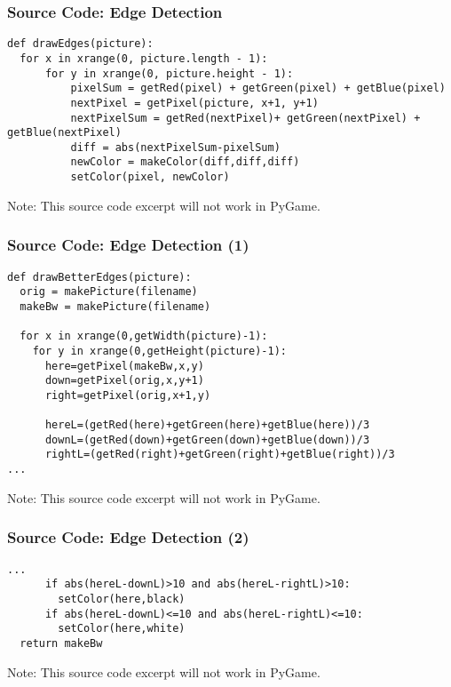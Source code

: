 \begin{frame}[fragile]
	\frametitle{Source Code: Edge Detection}
	
\begin{lstlisting}
def drawEdges(picture):
  for x in xrange(0, picture.length - 1):
      for y in xrange(0, picture.height - 1):
          pixelSum = getRed(pixel) + getGreen(pixel) + getBlue(pixel)
          nextPixel = getPixel(picture, x+1, y+1)
          nextPixelSum = getRed(nextPixel)+ getGreen(nextPixel) + getBlue(nextPixel)
          diff = abs(nextPixelSum-pixelSum)
          newColor = makeColor(diff,diff,diff)
          setColor(pixel, newColor)
\end{lstlisting}

Note: This source code excerpt will not work in PyGame.

\end{frame}


\begin{frame}[fragile]
	\frametitle{Source Code: Edge Detection (1)}
	
\begin{lstlisting}
def drawBetterEdges(picture):
  orig = makePicture(filename)
  makeBw = makePicture(filename)
  
  for x in xrange(0,getWidth(picture)-1):
    for y in xrange(0,getHeight(picture)-1):
      here=getPixel(makeBw,x,y)
      down=getPixel(orig,x,y+1)
      right=getPixel(orig,x+1,y)
      
      hereL=(getRed(here)+getGreen(here)+getBlue(here))/3
      downL=(getRed(down)+getGreen(down)+getBlue(down))/3
      rightL=(getRed(right)+getGreen(right)+getBlue(right))/3
...
\end{lstlisting}

Note: This source code excerpt will not work in PyGame.

\end{frame}

\begin{frame}[fragile]
	\frametitle{Source Code: Edge Detection (2)}
	
\begin{lstlisting}
...
      if abs(hereL-downL)>10 and abs(hereL-rightL)>10:
        setColor(here,black)
      if abs(hereL-downL)<=10 and abs(hereL-rightL)<=10:
        setColor(here,white)
  return makeBw
\end{lstlisting}

Note: This source code excerpt will not work in PyGame.

\end{frame}

